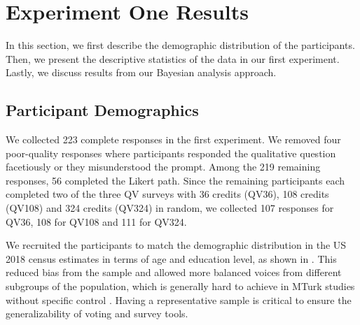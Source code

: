 \section{Experiment One Results} \label{results-1-quan}
In this section, we first describe the demographic distribution of the participants. Then, we present the descriptive statistics of the data in our first experiment. Lastly, we discuss results from our Bayesian analysis approach.

\subsection{Participant Demographics}
    
We collected 223 complete responses in the first experiment.  We removed four poor-quality responses where participants responded the qualitative question facetiously or they misunderstood the prompt. Among the 219 remaining responses, 56 completed the Likert path. Since the remaining participants each completed two of the three QV surveys with 36 credits (QV36), 108 credits (QV108) and 324 credits (QV324) in random, we collected 107 responses for QV36, 108 for QV108 and 111 for QV324. 

We recruited the participants to match the demographic distribution in the US 2018 census estimates in terms of age and education level, as shown in . This reduced bias from the sample and allowed more balanced voices from different subgroups of the population, which is generally hard to achieve in MTurk studies without specific control \cite{difallah2018demographics}. Having a representative sample is critical to ensure the generalizability of voting and survey tools. 


